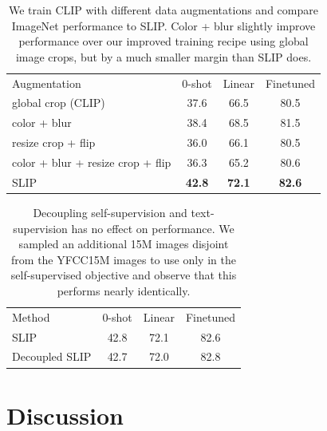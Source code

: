 \documentclass[10pt,twocolumn,letterpaper]{article}
\newcommand{\tablestyle}[2]{\setlength{\tabcolsep}{#1}\renewcommand{\arraystretch}{#2}\centering\footnotesize}
\begin{document}
\begin{table}[ht]
\tablestyle{2pt}{1.1}
\setlength{\tabcolsep}{4pt}
\begin{tabular}{l c c c}
Augmentation & 0-shot & Linear & Finetuned \\
\shline
global crop (CLIP) & 37.6 & 66.5 & 80.5 \\
color + blur & 38.4 & 68.5 & 81.5 \\
resize crop + flip & 36.0 & 66.1 & 80.5 \\
color + blur + resize crop + flip & 36.3 & 65.2 & 80.6 \\
\hline
SLIP & \textbf{42.8} & \textbf{72.1} & \textbf{82.6} \\
\end{tabular}
\vspace{-.5em}
\caption{We train CLIP with different data augmentations and compare ImageNet performance to SLIP.
Color + blur slightly improve performance over our improved training recipe using global image crops, but by a much smaller margin than SLIP does.
}
\label{tab:augmentations}
\vspace{-.5em}
\end{table}

\begin{table}[ht]
\tablestyle{2pt}{1.1}
\setlength{\tabcolsep}{4pt}
\begin{tabular}{l c c c}
Method & 0-shot & Linear & Finetuned \\
\shline
SLIP & 42.8 & 72.1 & 82.6 \\
Decoupled SLIP & 42.7 & 72.0 & 82.8 \\
\end{tabular}
\vspace{-.5em}
\caption{Decoupling self-supervision and text-supervision has no effect on performance.
We sampled an additional 15M images disjoint from the YFCC15M images to use only in the self-supervised objective and observe that this performs nearly identically.
}
\label{tab:decoupled}
\vspace{-.5em}
\end{table}

\section{Discussion}
\label{sec:discussion}
\end{document}
